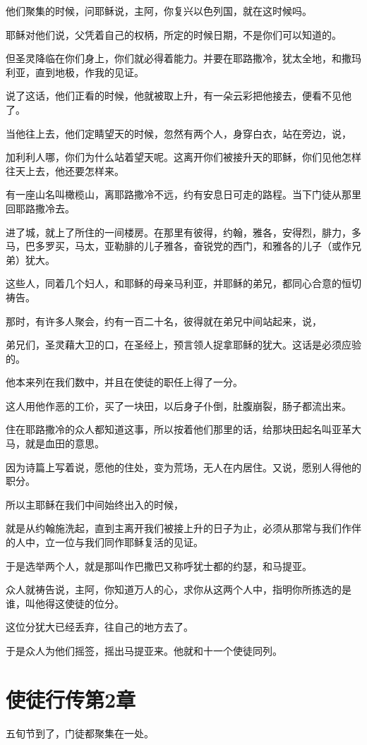 \documentclass[12pt,oneside]{book}
\begin{document}
他们聚集的时候，问耶稣说，主阿，你复兴以色列国，就在这时候吗。

耶稣对他们说，父凭着自己的权柄，所定的时候日期，不是你们可以知道的。

但圣灵降临在你们身上，你们就必得着能力。并要在耶路撒冷，犹太全地，和撒玛利亚，直到地极，作我的见证。

说了这话，他们正看的时候，他就被取上升，有一朵云彩把他接去，便看不见他了。

当他往上去，他们定睛望天的时候，忽然有两个人，身穿白衣，站在旁边，说，

加利利人哪，你们为什么站着望天呢。这离开你们被接升天的耶稣，你们见他怎样往天上去，他还要怎样来。

有一座山名叫橄榄山，离耶路撒冷不远，约有安息日可走的路程。当下门徒从那里回耶路撒冷去。

进了城，就上了所住的一间楼房。在那里有彼得，约翰，雅各，安得烈，腓力，多马，巴多罗买，马太，亚勒腓的儿子雅各，奋锐党的西门，和雅各的儿子（或作兄弟）犹大。

这些人，同着几个妇人，和耶稣的母亲马利亚，并耶稣的弟兄，都同心合意的恒切祷告。

那时，有许多人聚会，约有一百二十名，彼得就在弟兄中间站起来，说，

弟兄们，圣灵藉大卫的口，在圣经上，预言领人捉拿耶稣的犹大。这话是必须应验的。

他本来列在我们数中，并且在使徒的职任上得了一分。

这人用他作恶的工价，买了一块田，以后身子仆倒，肚腹崩裂，肠子都流出来。

住在耶路撒冷的众人都知道这事，所以按着他们那里的话，给那块田起名叫亚革大马，就是血田的意思。

因为诗篇上写着说，愿他的住处，变为荒场，无人在内居住。又说，愿别人得他的职分。

所以主耶稣在我们中间始终出入的时候，

就是从约翰施洗起，直到主离开我们被接上升的日子为止，必须从那常与我们作伴的人中，立一位与我们同作耶稣复活的见证。

于是选举两个人，就是那叫作巴撒巴又称呼犹士都的约瑟，和马提亚。

众人就祷告说，主阿，你知道万人的心，求你从这两个人中，指明你所拣选的是谁，叫他得这使徒的位分。

这位分犹大已经丢弃，往自己的地方去了。

于是众人为他们摇签，摇出马提亚来。他就和十一个使徒同列。

\chapter{使徒行传第2章}
五旬节到了，门徒都聚集在一处。
\end{document}
